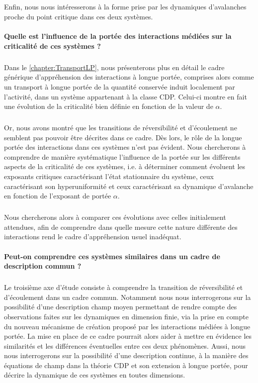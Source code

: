 \subparagraph{}Enfin, nous nous intéresserons à la forme prise par les dynamiques d'avalanches proche du point critique dans ces deux systèmes.

\paragraph{Quelle est l'influence de la portée des interactions médiées sur la criticalité de ces systèmes ?}

\subparagraph{}Dans le \autoref{chapter:TransportLP}, nous présenterons plus en détail le cadre générique d'appréhension des interactions à longue portée, comprises alors comme un transport à longue portée de la quantité conservée induit localement par l'activité, dans un système appartenant à la classe CDP. Celui-ci montre en fait une évolution de la criticalité bien définie en fonction de la valeur de $\alpha$.

\subparagraph{}Or, nous avons montré que les transitions de réversibilité et d'écoulement ne semblent pas pouvoir être décrites dans ce cadre. Dès lors, le rôle de la longue portée des interactions dans ces systèmes n'est pas évident. Nous chercherons à comprendre de manière systématique l'influence de la portée sur les différents aspects de la criticalité de ces systèmes, i.e. à déterminer comment évoluent les exposants critiques caractérisant l'état stationnaire du système, ceux caractérisant son hyperuniformité et ceux caractérisant sa dynamique d'avalanche en fonction de l'exposant de portée $\alpha$.

\subparagraph{}Nous chercherons alors à comparer ces évolutions avec celles initialement attendues, afin de comprendre dans quelle mesure cette nature différente des interactions rend le cadre d'appréhension usuel inadéquat.

\paragraph{Peut-on comprendre ces systèmes similaires dans un cadre de description commun ?}

\subparagraph{}Le troisième axe d'étude consiste à comprendre la transition de réversibilité et d'écoulement dans un cadre commun. Notamment nous nous interrogerons sur la possibilité d'une description champ moyen permettant de rendre compte des observations faites sur les dynamiques en dimension finie, via la prise en compte du nouveau mécanisme de création proposé par les interactions médiées à longue portée. La mise en place de ce cadre pourrait alors aider à mettre en évidence les similarités et les différences éventuelles entre ces deux phénomènes. Aussi, nous nous interrogerons sur la possibilité d'une description continue, à la manière des équations de champ dans la théorie CDP et son extension à longue portée, pour décrire la dynamique de ces systèmes en toutes dimensions.

